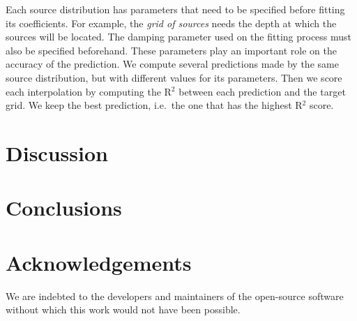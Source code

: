 \documentclass[twocolumn]{article}
\begin{document}
Each source distribution has parameters that need to be specified before
fitting its coefficients.
For example, the \emph{grid of sources} needs the depth at which the sources
will be located.
The damping parameter used on the fitting process must also be specified
beforehand.
These parameters play an important role on the accuracy of the prediction.
We compute several predictions made by the same source distribution, but with
different values for its parameters.
Then we score each interpolation by computing the R$^2$ between each prediction
and the target grid.
We keep the best prediction, i.e.\ the one that has the highest R$^2$ score.


\section{Discussion}


\section{Conclusions}


\section{Acknowledgements}

We are indebted to the developers and maintainers of the open-source software
without which this work would not have been possible.




\end{document}
